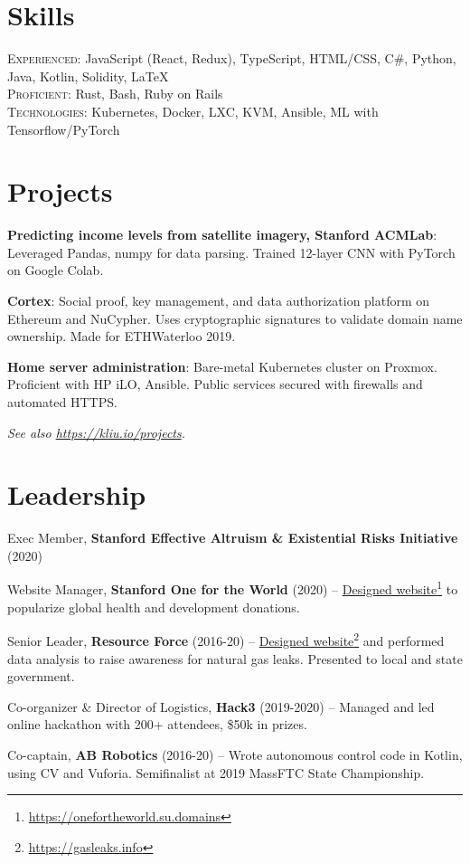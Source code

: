 \documentclass[paper=letter]{tccv}
\newcommand{\myhref}[2]{\href{#1}{#2}\footnote{\url{#1}}}
\begin{document}
\section{Skills}

\textsc{Experienced}: JavaScript (React, Redux), TypeScript, HTML/CSS, C\#,
     Python, Java, Kotlin, Solidity, \LaTeX\\
\textsc{Proficient}: Rust, Bash, Ruby on Rails\\
\textsc{Technologies}: Kubernetes, Docker, LXC, KVM, Ansible, ML with
Tensorflow/PyTorch


\section{Projects}

\textbf{Predicting income levels from satellite imagery, Stanford ACMLab}:
Leveraged Pandas, numpy for data parsing. Trained 12-layer CNN with PyTorch on
Google Colab.

\textbf{Cortex}: Social proof, key management, and data authorization platform
on Ethereum and NuCypher. Uses cryptographic signatures to validate domain name
ownership. Made for ETHWaterloo 2019.

\textbf{Home server administration}: Bare-metal Kubernetes cluster on Proxmox.
Proficient with HP iLO, Ansible. Public services secured with firewalls and
automated HTTPS.

\textit{See also \url{https://kliu.io/projects}.}

\section{Leadership}

Exec Member, \textbf{Stanford Effective Altruism \& Existential Risks
Initiative} (2020)

Website Manager, \textbf{Stanford One for the World} (2020) --
\myhref{https://onefortheworld.su.domains}{Designed website} to popularize
global health and development donations.

Senior Leader, \textbf{Resource Force} (2016-20) --
    \myhref{https://gasleaks.info}{Designed website} and performed data analysis
    to raise awareness for natural gas leaks. Presented to local and state
    government.
    
Co-organizer \& Director of Logistics, \textbf{Hack3} (2019-2020) -- Managed and led online hackathon
    with 200+ attendees, \$50k in prizes.

Co-captain, \textbf{AB Robotics} (2016-20) -- Wrote autonomous control code in
Kotlin, using CV and Vuforia. Semifinalist at 2019 MassFTC State Championship.
\end{document}
